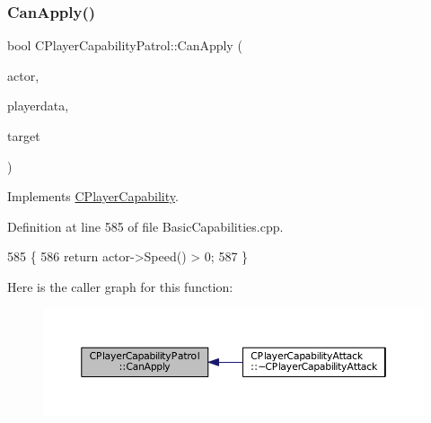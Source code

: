 \hypertarget{classCPlayerCapabilityPatrol_a63c099d931e1e57db01120db7b1fdbe4}{}\label{classCPlayerCapabilityPatrol_a63c099d931e1e57db01120db7b1fdbe4} 
\subsubsection{\texorpdfstring{Can\+Apply()}{CanApply()}}
{\footnotesize\ttfamily bool C\+Player\+Capability\+Patrol\+::\+Can\+Apply (\begin{DoxyParamCaption}\item[{std\+::shared\+\_\+ptr$<$ \hyperlink{classCPlayerAsset}{C\+Player\+Asset} $>$}]{actor,  }\item[{std\+::shared\+\_\+ptr$<$ \hyperlink{classCPlayerData}{C\+Player\+Data} $>$}]{playerdata,  }\item[{std\+::shared\+\_\+ptr$<$ \hyperlink{classCPlayerAsset}{C\+Player\+Asset} $>$}]{target }\end{DoxyParamCaption})\hspace{0.3cm}{\ttfamily [virtual]}}



Implements \hyperlink{classCPlayerCapability_ae96263e0950f496492f8baeb877b9554}{C\+Player\+Capability}.



Definition at line 585 of file Basic\+Capabilities.\+cpp.


\begin{DoxyCode}
585                                                                                                            
                                                   \{
586     \textcolor{keywordflow}{return} actor->Speed() > 0;
587 \}
\end{DoxyCode}
Here is the caller graph for this function\+:\nopagebreak
\begin{figure}[H]
\begin{center}
\leavevmode
\includegraphics[width=350pt]{classCPlayerCapabilityPatrol_a63c099d931e1e57db01120db7b1fdbe4_icgraph}
\end{center}
\end{figure}
\hypertarget{classCPlayerCapabilityPatrol_a48e60ecd544759f3aad66afeb4a6e0a9}{}\label{classCPlayerCapabilityPatrol_a48e60ecd544759f3aad66afeb4a6e0a9} 

